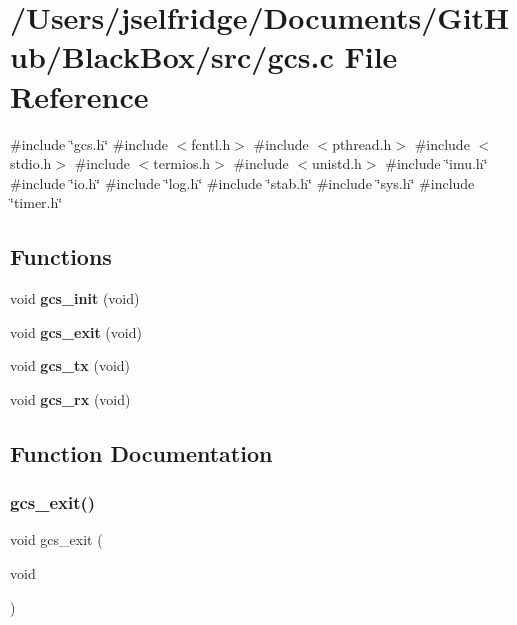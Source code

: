 \section{/\+Users/jselfridge/\+Documents/\+Git\+Hub/\+Black\+Box/src/gcs.c File Reference}
\label{gcs_8c}
{\ttfamily \#include \char`\"{}gcs.\+h\char`\"{}}\newline
{\ttfamily \#include $<$fcntl.\+h$>$}\newline
{\ttfamily \#include $<$pthread.\+h$>$}\newline
{\ttfamily \#include $<$stdio.\+h$>$}\newline
{\ttfamily \#include $<$termios.\+h$>$}\newline
{\ttfamily \#include $<$unistd.\+h$>$}\newline
{\ttfamily \#include \char`\"{}imu.\+h\char`\"{}}\newline
{\ttfamily \#include \char`\"{}io.\+h\char`\"{}}\newline
{\ttfamily \#include \char`\"{}log.\+h\char`\"{}}\newline
{\ttfamily \#include \char`\"{}stab.\+h\char`\"{}}\newline
{\ttfamily \#include \char`\"{}sys.\+h\char`\"{}}\newline
{\ttfamily \#include \char`\"{}timer.\+h\char`\"{}}\newline
\subsection*{Functions}
\begin{DoxyCompactItemize}
\item 
void \textbf{ gcs\+\_\+init} (void)
\item 
void \textbf{ gcs\+\_\+exit} (void)
\item 
void \textbf{ gcs\+\_\+tx} (void)
\item 
void \textbf{ gcs\+\_\+rx} (void)
\end{DoxyCompactItemize}


\subsection{Function Documentation}
\mbox{\label{gcs_8c_a1eee329df0998f954f117821626b68f1}} 
\subsubsection{gcs\+\_\+exit()}
{\footnotesize\ttfamily void gcs\+\_\+exit (\begin{DoxyParamCaption}\item[{void}]{ }\end{DoxyParamCaption})}

